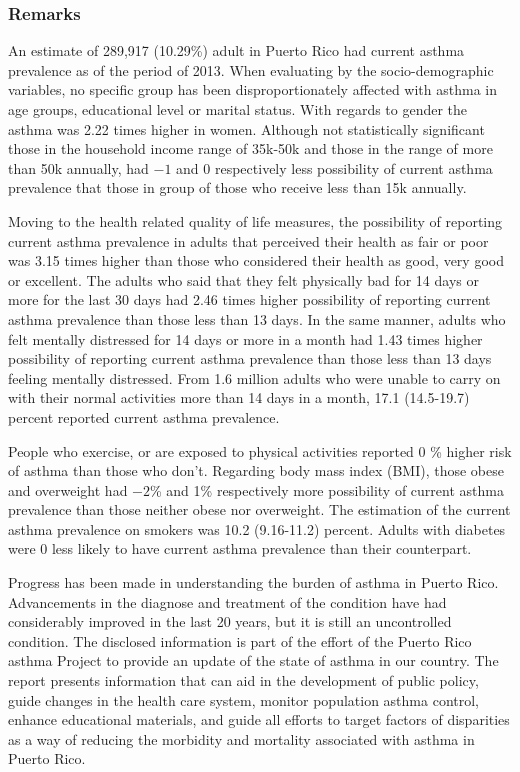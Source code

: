  \subsubsection{Remarks}

An estimate of 289,917 
(10.29\%) adult in Puerto Rico had current asthma prevalence as of the period of 2013.
When evaluating by the socio-demographic variables, no specific group has been disproportionately affected with asthma in age groups, educational level or marital status. With regards to gender the asthma was 2.22 times higher in women. Although not statistically significant those in the household income range of 35k-50k and those in the range of more than 50k annually, had \ensuremath{-1} and 0 respectively less possibility of current asthma prevalence that those  in group of those who receive less than 15k annually.

Moving to the health related quality of life measures, the possibility of reporting current asthma prevalence in adults that perceived their health as fair or poor was 3.15 times higher than those who considered their health as good, very good or excellent. The adults who said that they felt physically bad for 14 days or more for the last 30 days had 2.46 times higher possibility of reporting current asthma prevalence than those less than 13 days. In the same manner, adults who felt mentally distressed for 14 days or more in a month had 1.43 times higher possibility of reporting current asthma prevalence than those less than 13 days feeling mentally distressed. From 1.6 million adults who were unable to carry on with their normal activities more than 14 days in a month, 17.1 (14.5-19.7) percent reported current asthma prevalence. 

People who exercise, or are exposed to physical activities reported 0 \% higher risk of asthma than those who don't.  Regarding body mass index (BMI), those obese and overweight had \ensuremath{-2}\% and 1\% respectively more possibility of current asthma prevalence than those neither obese nor overweight. The estimation of the current asthma prevalence on smokers was 10.2 (9.16-11.2) percent.  Adults with diabetes were 0\5 less likely to have current asthma prevalence than their counterpart.



Progress has been made in understanding the burden of asthma in Puerto Rico. Advancements in the diagnose and treatment of the condition have had considerably improved in the last 20 years, but it is still an uncontrolled condition. The disclosed information is part of the effort of the Puerto Rico asthma Project to provide an update of the state of asthma in our country. The report presents information that can aid in the development of public policy, guide changes in the health care system, monitor population asthma control, enhance educational materials, and guide all efforts to target factors of disparities as a way of reducing the morbidity and mortality associated with asthma in Puerto Rico.


